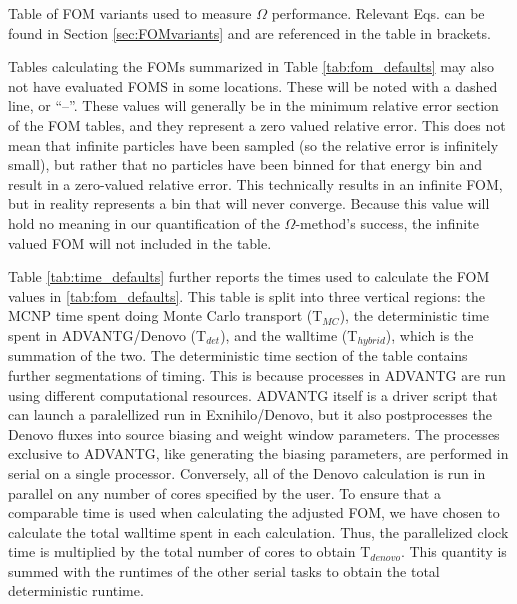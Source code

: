\begin{table}[h!]
  \centering
  
  \caption[Table of FOM variants used to measure $\Omega$ performance.]{
  Table of FOM variants used to measure $\Omega$ performance. Relevant Eqs. can
  be found in Section \ref{sec:FOMvariants} and are referenced in the table in
  brackets.}
  \label{tab:fom_defaults}
\end{table}

Tables calculating the FOMs summarized in Table \ref{tab:fom_defaults} may also
not have evaluated FOMS in some locations. These will be noted with a dashed
line, or ``--''.  These values will generally be in the minimum relative error
section of the FOM tables, and they represent a zero valued relative error. This
does not mean that infinite particles have been sampled (so the relative error
is infinitely small), but rather that no particles have been binned for that
energy bin and result in a zero-valued relative error.
This technically results in an infinite FOM, but in reality
represents a bin that will never converge. Because this value will hold no
meaning in our quantification of the $\Omega$-method's success, the infinite
valued FOM will not included in the table.


Table \ref{tab:time_defaults} further reports the times used to calculate the
FOM values in \ref{tab:fom_defaults}. This table is split into three
vertical regions: the MCNP time spent doing Monte Carlo transport (T$_{MC}$),
the deterministic time spent in ADVANTG/Denovo (T$_{det}$),
and the walltime (T$_{hybrid}$), which is the
summation of the two. The deterministic time section of the table contains
further segmentations of timing. This is because processes in ADVANTG are
run using different computational resources. ADVANTG itself is a driver script
that can launch a paralellized run in Exnihilo/Denovo, but it also postprocesses the
Denovo fluxes into source biasing and weight window parameters. The processes
exclusive to ADVANTG, like generating the biasing parameters, are performed in
serial on a single processor. Conversely, all of the Denovo calculation is run
in parallel on any number of cores specified by the user. To ensure that a
comparable time is used when calculating the adjusted FOM, we have chosen to
calculate the total walltime spent in each calculation. Thus, the parallelized
clock time is multiplied by the total number of cores to obtain T$_{denovo}$.
This quantity is summed with
the runtimes of the other serial tasks to obtain the total deterministic runtime.

